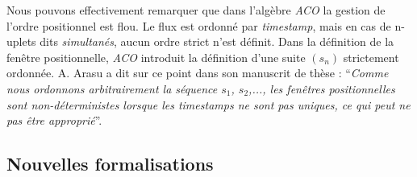 Nous pouvons effectivement remarquer que dans l'algèbre \textit{ACO} la gestion de l'ordre positionnel est flou. Le flux est ordonné par \textit{timestamp}, mais en cas de n-uplets dits \textit{simultanés}, aucun ordre strict n'est définit. Dans la définition de la fenêtre positionnelle, \textit{ACO} introduit la définition d'une suite $(s_n)$ strictement ordonnée. A. Arasu a dit sur ce point dans son manuscrit de thèse : \enquote{\it Comme nous ordonnons arbitrairement la séquence $s_1$, $s_2$,..., les fenêtres positionnelles sont non-déterministes lorsque les \textit{timestamps} ne sont pas uniques, ce qui peut ne pas être approprié}.





\subsection{Nouvelles formalisations}

